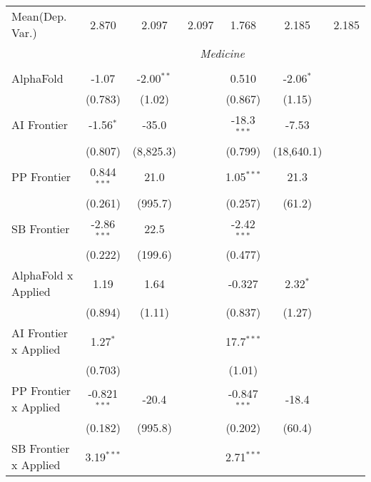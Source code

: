 \begin{tabular}{lcccccc}
Mean(Dep. Var.) & 2.870 & 2.097 & 2.097 & 1.768 & 2.185 & 2.185 \\
 & \multicolumn{6}{c}{\textit{Medicine}} \\ \\
   AlphaFold                    & -1.07          & -2.00$^{**}$ &             & 0.510          & -2.06$^{*}$ &   \\   
                                & (0.783)        & (1.02)       &             & (0.867)        & (1.15)      &   \\   
   AI Frontier                  & -1.56$^{*}$    & -35.0        &             & -18.3$^{***}$  & -7.53       &   \\   
                                & (0.807)        & (8,825.3)    &             & (0.799)        & (18,640.1)  &   \\   
   PP Frontier                  & 0.844$^{***}$  & 21.0         &             & 1.05$^{***}$   & 21.3        &   \\   
                                & (0.261)        & (995.7)      &             & (0.257)        & (61.2)      &   \\   
   SB Frontier                  & -2.86$^{***}$  & 22.5         &             & -2.42$^{***}$  &             &   \\   
                                & (0.222)        & (199.6)      &             & (0.477)        &             &   \\   
   AlphaFold x Applied          & 1.19           & 1.64         &             & -0.327         & 2.32$^{*}$  &   \\   
                                & (0.894)        & (1.11)       &             & (0.837)        & (1.27)      &   \\   
   AI Frontier x Applied        & 1.27$^{*}$     &              &             & 17.7$^{***}$   &             &   \\   
                                & (0.703)        &              &             & (1.01)         &             &   \\   
   PP Frontier x Applied        & -0.821$^{***}$ & -20.4        &             & -0.847$^{***}$ & -18.4       &   \\   
                                & (0.182)        & (995.8)      &             & (0.202)        & (60.4)      &   \\   
   SB Frontier x Applied        & 3.19$^{***}$   &              &             & 2.71$^{***}$   &             &   \\   

\end{tabular}
